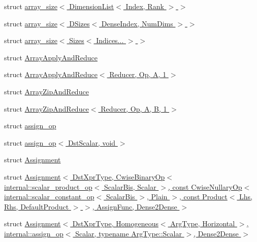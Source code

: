 \begin{DoxyCompactItemize}
\item 
struct \hyperlink{struct_eigen_1_1internal_1_1array__size_3_01_dimension_list_3_01_index_00_01_rank_01_4_01_4}{array\+\_\+size$<$ Dimension\+List$<$ Index, Rank $>$ $>$}
\item 
struct \hyperlink{struct_eigen_1_1internal_1_1array__size_3_01_d_sizes_3_01_dense_index_00_01_num_dims_01_4_01_4}{array\+\_\+size$<$ D\+Sizes$<$ Dense\+Index, Num\+Dims $>$ $>$}
\item 
struct \hyperlink{struct_eigen_1_1internal_1_1array__size_3_01_sizes_3_01_indices_8_8_8_01_4_01_4}{array\+\_\+size$<$ Sizes$<$ Indices... $>$ $>$}
\item 
struct \hyperlink{struct_eigen_1_1internal_1_1_array_apply_and_reduce}{Array\+Apply\+And\+Reduce}
\item 
struct \hyperlink{struct_eigen_1_1internal_1_1_array_apply_and_reduce_3_01_reducer_00_01_op_00_01_a_00_011_01_4}{Array\+Apply\+And\+Reduce$<$ Reducer, Op, A, 1 $>$}
\item 
struct \hyperlink{struct_eigen_1_1internal_1_1_array_zip_and_reduce}{Array\+Zip\+And\+Reduce}
\item 
struct \hyperlink{struct_eigen_1_1internal_1_1_array_zip_and_reduce_3_01_reducer_00_01_op_00_01_a_00_01_b_00_011_01_4}{Array\+Zip\+And\+Reduce$<$ Reducer, Op, A, B, 1 $>$}
\item 
struct \hyperlink{struct_eigen_1_1internal_1_1assign__op}{assign\+\_\+op}
\item 
struct \hyperlink{struct_eigen_1_1internal_1_1assign__op_3_01_dst_scalar_00_01void_01_4}{assign\+\_\+op$<$ Dst\+Scalar, void $>$}
\item 
struct \hyperlink{struct_eigen_1_1internal_1_1_assignment}{Assignment}
\item 
struct \hyperlink{struct_eigen_1_1internal_1_1_assignment_3_01_dst_xpr_type_00_01_cwise_binary_op_3_01internal_1_1eb29cc77263dc530639098c389efc225}{Assignment$<$ Dst\+Xpr\+Type, Cwise\+Binary\+Op$<$ internal\+::scalar\+\_\+product\+\_\+op$<$ Scalar\+Bis, Scalar $>$, const Cwise\+Nullary\+Op$<$ internal\+::scalar\+\_\+constant\+\_\+op$<$ Scalar\+Bis $>$, Plain $>$, const Product$<$ Lhs, Rhs, Default\+Product $>$ $>$, Assign\+Func, Dense2\+Dense $>$}
\item 
struct \hyperlink{struct_eigen_1_1internal_1_1_assignment_3_01_dst_xpr_type_00_01_homogeneous_3_01_arg_type_00_01_bd4940a657c6f656a2015456f5ba4803}{Assignment$<$ Dst\+Xpr\+Type, Homogeneous$<$ Arg\+Type, Horizontal $>$, internal\+::assign\+\_\+op$<$ Scalar, typename Arg\+Type\+::\+Scalar $>$, Dense2\+Dense $>$}

\end{DoxyCompactItemize}

